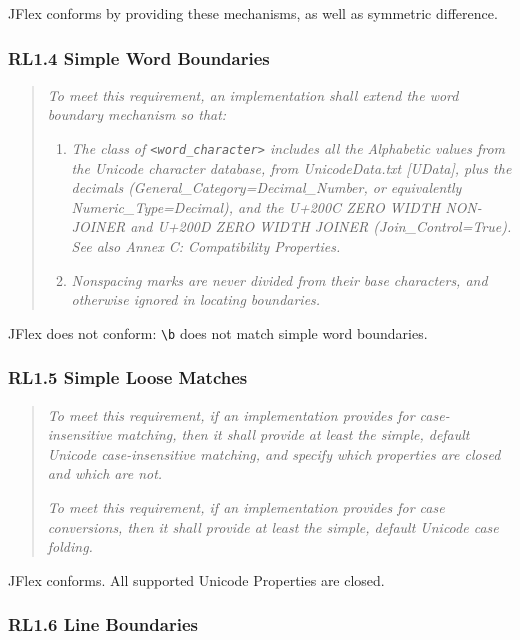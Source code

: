 \documentclass[11pt]{scrartcl}
\begin{document}
JFlex conforms by providing these mechanisms, as well as symmetric
difference.

\subsubsection*{RL1.4 Simple Word Boundaries}

\begin{quote}
\emph{To meet this requirement, an implementation shall extend the word
boundary mechanism so that:}

  \begin{enumerate}
  \item
    \emph{The class of \texttt{<word\_character>} includes all the Alphabetic
    values from the Unicode character database, from UnicodeData.txt [UData],
    plus the decimals (General\_Category=Decimal\_Number, or equivalently 
    Numeric\_Type=Deci\-mal), and the U+200C ZERO WIDTH NON-JOINER and
    U+200D ZERO WIDTH JOINER (Join\_Control=True). See also Annex C:
    Compatibility Properties.}

  \item
    \emph{Nonspacing marks are never divided from their base characters, and
    otherwise ignored in locating boundaries.}
  \end{enumerate}
\end{quote}

JFlex does not conform: \verb+\b+ does not match simple word boundaries.

\subsubsection*{RL1.5 Simple Loose Matches}

\begin{quote}
\emph{To meet this requirement, if an implementation provides for 
case-insensitive matching, then it shall provide at least the simple,
default Unicode case-insensitive matching, and specify which properties
are closed and which are not.}
            
\emph{To meet this requirement, if an implementation provides for case
conversions, then it shall provide at least the simple, default Unicode
case folding.}
\end{quote}

JFlex conforms. All supported Unicode Properties are closed.

\subsubsection*{RL1.6 Line Boundaries}
\end{document}
